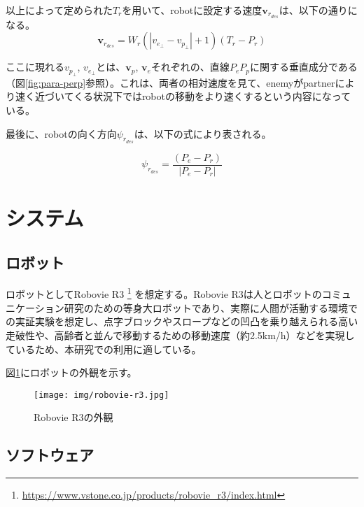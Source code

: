 \documentclass{kuisthesis}
\begin{document}
以上によって定められた$T_r$を用いて、robotに設定する速度$\bm{v}_r_{des}$は、以下の通りになる。
\begin{equation}
	\bm{v}_r_{des} = W_r (|v_e_{\perp} - v_p_{\perp}|+1)(T_r - P_r) \nonumber
\end{equation}

ここに現れる$v_p_{\perp}$, $v_e_{\perp}$とは、$\bm{v}_p$, $\bm{v}_e$それぞれの、直線$P_e P_p$に関する垂直成分である（図\ref{fig:para-perp}参照）。これは、両者の相対速度を見て、enemyがpartnerにより速く近づいてくる状況下ではrobotの移動をより速くするという内容になっている。


最後に、robotの向く方向$\psi_r_{des}$は、以下の式により表される。

\begin{equation}
	\psi_r_{des} = \frac{(P_e - P_r)}{|P_e - P_r|} \nonumber
\end{equation}








\section{システム}

\subsection{ロボット}

ロボットとしてRobovie R3 \footnote{\url{https://www.vstone.co.jp/products/robovie_r3/index.html}} を想定する。Robovie R3は人とロボットのコミュニケーション研究のための等身大ロボットであり、実際に人間が活動する環境での実証実験を想定し、点字ブロックやスロープなどの凹凸を乗り越えられる高い走破性や、高齢者と並んで移動するための移動速度（約2.5km/h）などを実現しているため、本研究での利用に適している。

図\ref{fig:robovie-r3}にロボットの外観を示す。

\begin{figure}[h]\begin{center}
	\texttt{[image: img/robovie-r3.jpg]}
	\caption{Robovie R3の外観}
	\label{fig:robovie-r3}
\end{center}\end{figure}

\subsection{ソフトウェア}
\end{document}
